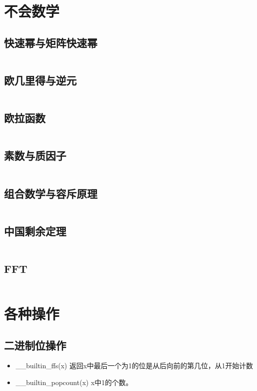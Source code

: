 \documentclass[a4paper,13.6pt]{article}
\begin{document}
\begin{CJK}{UTF8}{gbsn}
\newpage
\section{不会数学}
\subsection{快速幂与矩阵快速幂}
\inputminted{c++}{../ACM_Template/Math/Fast_Power.cpp}
\subsection{欧几里得与逆元}
\inputminted{c++}{../ACM_Template/Math/Euclid_And_Inverse.cpp}
\subsection{欧拉函数}
\inputminted{c++}{../ACM_Template/Math/Eular_phi.cpp}
\subsection{素数与质因子}
\inputminted{c++}{../ACM_Template/Math/Primes_And_Factors.cpp}
\subsection{组合数学与容斥原理}
\inputminted{c++}{../ACM_Template/Math/CombinatoricsMath_And_Exclusion.cpp}
\subsection{中国剩余定理}
\inputminted{c++}{../ACM_Template/Math/China_Remainder_Theorem.cpp}
\subsection{FFT}
\inputminted{c++}{../ACM_Template/Math/FFT.cpp}

\newpage
\section{各种操作}
\subsection{二进制位操作} 
\begin{itemize}
\item \_\_builtin\_ffs(x)  返回x中最后一个为1的位是从后向前的第几位，从1开始计数

\item \_\_builtin\_popcount(x)  x中1的个数。


\end{itemize}
\end{CJK}
\end{document}
